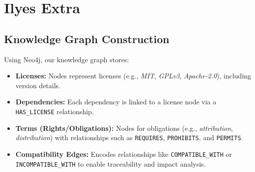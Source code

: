 
\vspace{-.2cm}
\section{Ilyes Extra}


\subsection{Knowledge Graph Construction}
Using Neo4j, our knowledge graph stores:
\begin{itemize}
    \item \textbf{Licenses:} Nodes represent licenses (e.g., \emph{MIT}, \emph{GPLv3}, \emph{Apache-2.0}), including version details.
    \item \textbf{Dependencies:} Each dependency is linked to a license node via a \texttt{HAS\_LICENSE} relationship.
    \item \textbf{Terms (Rights/Obligations):} Nodes for obligations (e.g., \emph{attribution}, \emph{distribution}) with relationships such as \texttt{REQUIRES}, \texttt{PROHIBITS}, and \texttt{PERMITS}.
    \item \textbf{Compatibility Edges:} Encodes relationships like \texttt{COMPATIBLE\_WITH} or \texttt{INCOMPATIBLE\_WITH} to enable traceability and impact analysis.
\end{itemize}




